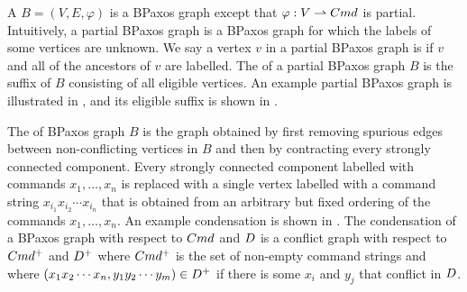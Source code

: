 A  $B = (V, E, \varphi)$ is a BPaxos graph except
that $\varphi: V \rightharpoonup Cmd$ is partial. Intuitively, a partial BPaxos
graph is a BPaxos graph for which the labels of some vertices are unknown.
%
We say a vertex $v$ in a partial BPaxos graph is  if $v$
and all of the ancestors of $v$ are labelled. The  of
a partial BPaxos graph $B$ is the suffix of $B$ consisting of all eligible
vertices.
%
An example partial BPaxos graph is illustrated in ,
and its eligible suffix is shown in .

The  of BPaxos graph $B$ is the graph obtained by first
removing spurious edges between non-conflicting vertices in $B$ and then by
contracting every strongly connected component. Every strongly connected
component labelled with commands $x_1, \ldots, x_n$ is replaced with a single
vertex labelled with a command string $x_{i_1} x_{i_2} \cdots x_{i_n}$ that is
obtained from an arbitrary but fixed ordering of the commands $x_1, \ldots,
x_n$. An example condensation is shown in .
%
The condensation of a BPaxos graph with respect to $Cmd$ and $D$ is
a conflict graph with respect to $Cmd^+$ and $D^+$ where $Cmd^+$ is
the set of non-empty command strings and where $(x_1 x_2 \cdots x_n, y_1 y_2
\cdots y_m) \in D^+$ if there is some $x_i$ and $y_j$ that conflict in
$D$.

